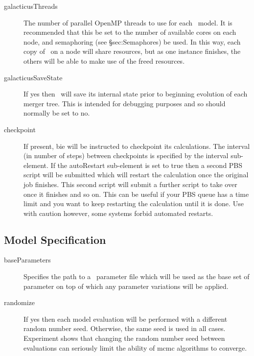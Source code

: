 \begin{description}
\item[{\normalfont \ttfamily galacticusThreads}] The number of parallel OpenMP threads to use for each \glc\ model. It is recommended that this be set to the number of available cores on each node, and semaphoring (see \S{sec:Semaphores}) be used. In this way, each copy of \glc\ on a node will share resources, but as one instance finishes, the others will be able to make use of the freed resources.
\item[{\normalfont \ttfamily galacticusSaveState}] If {\normalfont \ttfamily yes} then \glc\ will save its internal state prior to beginning evolution of each merger tree. This is intended for debugging purposes and so should normally be set to {\normalfont \ttfamily no}.
\item[{\normalfont \ttfamily checkpoint}] If present, \gls{bie} will be instructed to checkpoint its calculations. The interval (in number of steps) between checkpoints is specified by the {\normalfont \ttfamily interval} sub-element. If the {\normalfont \ttfamily autoRestart} sub-element is set to {\normalfont \ttfamily true} then a second PBS script will be submitted which will restart the calculation once the original job finishes. This second script will submit a further script to take over once it finishes and so on. This can be useful if your PBS queue has a time limit and you want to keep restarting the calculation until it is done. Use with caution however, some systems forbid automated restarts.
\end{description}

\subsection{Model Specification}

\begin{description}
\item[{\normalfont \ttfamily baseParameters}] Specifies the path to a \glc\ parameter file which will be used as the base set of parameter on top of which any parameter variations will be applied.
\item[{\normalfont \ttfamily randomize}] If {\normalfont \ttfamily yes} then each model evaluation will be performed with a different random number seed. Otherwise, the same seed is used in all cases. Experiment shows that changing the random number seed between evaluations can seriously limit the ability of \gls{mcmc} algorithms to converge.
\end{description}


